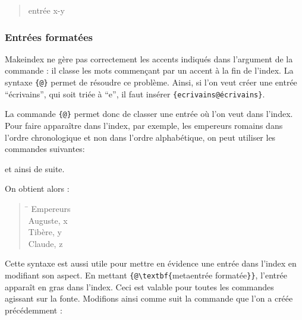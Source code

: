 \begin{quotation}
entrée x-y
\end{quotation}


\subsubsection{Entrées formatées}

Makeindex ne gère pas correctement les accents indiqués dans l'argument de la commande  : il classe les mots commençant par un accent à la fin de l'index. La syntaxe \verb|{|\verb|@|\verb+}+ permet de résoudre ce problème. Ainsi, si l'on veut créer une entrée \enquote{écrivains}, qui soit triée à \enquote{e}, il faut insérer \verb|{ecrivains@écrivains}|.

La commande \verb|{|\verb|@|\verb+}+ permet donc de classer une entrée où l'on veut dans l'index. Pour faire apparaître dans l'index, par exemple, les empereurs romains dans l'ordre chronologique et non dans l'ordre alphabétique, on peut utiliser les commandes suivantes:

\begin{latexcode}
et ainsi de suite. 
\end{latexcode}

On obtient alors :

\begin{quotation}
\begin{tabbing}
\hspace{0,5cm} \= \kill
Empereurs\\
\> Auguste, x\\
\> Tibère, y\\
\> Claude, z \\
\end{tabbing}
\end{quotation}

Cette syntaxe est aussi utile pour mettre en évidence une entrée dans l'index en modifiant son aspect. En mettant \verb|{|\verb|@\textbf{|meta{entrée formatée}\verb|}}|, l'entrée apparaît en gras dans l'index. Ceci est valable pour toutes les commandes agissant sur la fonte. Modifions ainsi comme suit la commande  que l'on a créée précédemment :

\begin{latexcode}
\newcommand\auteur[2]{#1~\textsc{#2}\index{#2 #1@\textsc{#2}, #1}\xspace}
\end{latexcode}

